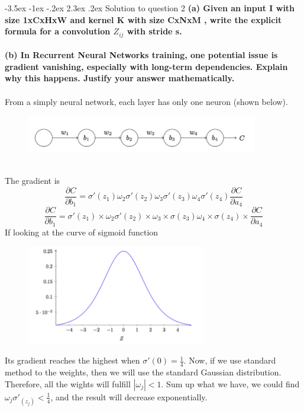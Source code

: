 \documentclass[12pt]{article}
\makeatletter
\renewcommand\section{\@startsection {section}{1}{\z@}%
	{-3.5ex \@plus -1ex \@minus -.2ex}%
	{2.3ex \@plus.2ex}%
	{\normalfont\large\bfseries}}%
\makeatother
\begin{document}
	\section{Solution to question 2}
	\textbf{(a) Given an input I with size 1xCxHxW and kernel K with size CxNxM , write the explicit formula for a convolution $Z_{ij}$ with stride s.}\\
	\\
	\textbf{(b) In Recurrent Neural Networks training, one potential issue is gradient vanishing, especially with long-term dependencies. Explain why this happens. Justify your answer mathematically.}\\
	\\
	From a simply neural network, each layer has only one neuron (shown below).\\
	\begin{figure}[htpb]
		\centering
		\includegraphics[width=0.9\textwidth]{images/1.png}
		\caption{}
	\end{figure}
	\\
	\noindent
	The gradient is 
	$$\frac{\partial C}{\partial b_1} = \sigma'(z_1)\omega_2\sigma'(z_2)\omega_3\sigma'(z_3)\omega_4\sigma'(z_4)\frac{\partial C}{\partial a_4}$$
	$$\frac{\partial C}{\partial b_1} = \sigma'(z_1)\times \omega_2 \sigma'(z_2) \times \omega_3 \times \sigma(z_3) \omega_4 \times \sigma(z_4) \times \frac{\partial C}{\partial a_4}$$
	\noindent
	If looking at the curve of sigmoid function
	\begin{figure}[htpb]
		\centering
		\includegraphics[width=0.7\textwidth]{images/2.png}
		\caption{}
	\end{figure}
	Its gradient reaches the highest when $\sigma'(0)=\frac{1}{4}$. Now, if we use standard method to the weights, then we will use the standard Gaussian distribution. Therefore, all the wights will fulfill $|\omega_j|<1$. Sum up what we have, we could find $\omega_j\sigma'_{(z_j)}<\frac{1}{4}$, and the result will decrease exponentially.\\
\end{document}
